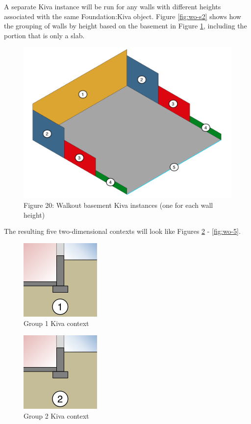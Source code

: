 A separate Kiva instance will be run for any walls with different
heights associated with the same Foundation:Kiva object. Figure
\ref{fig:wo-s2} shows how the grouping of walls by height based on the
basement in Figure \ref{fig:wo-w}, including the portion that is only a
slab.

\begin{figure}
\centering
\includegraphics{media/kiva-walkout-walls.png}
\caption{Figure 20: Walkout basement Kiva instances (one for each wall
height)\label{fig:wo-w}}
\end{figure}

The resulting five two-dimensional contexts will look like Figures
\ref{fig:wo-1} - \ref{fig:wo-5}.

\begin{figure}
\centering
\includegraphics{media/kiva-walkout-2d-1.png}
\caption{Group 1 Kiva context\label{fig:wo-1}}
\end{figure}

\begin{figure}
\centering
\includegraphics{media/kiva-walkout-2d-2.png}
\caption{Group 2 Kiva context\label{fig:wo-2}}
\end{figure}


